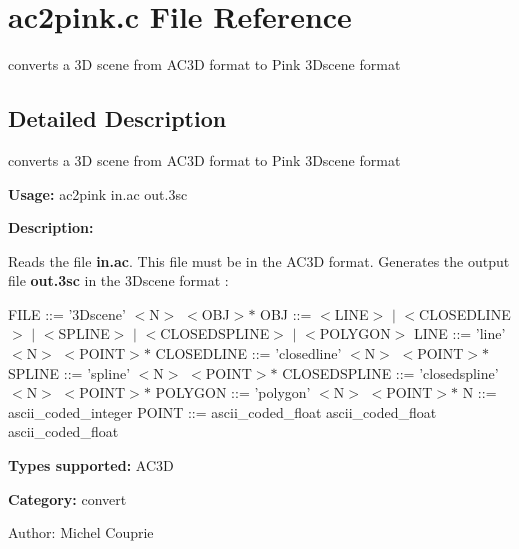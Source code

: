 \section{ac2pink.c File Reference}
\label{ac2pink_8c}
converts a 3D scene from AC3D format to Pink 3Dscene format  




\label{_details}
\subsection{Detailed Description}
converts a 3D scene from AC3D format to Pink 3Dscene format 

{\bf Usage:} ac2pink in.ac out.3sc

{\bf Description:}

Reads the file {\bf in.ac}. This file must be in the AC3D format. Generates the output file {\bf out.3sc} in the 3Dscene format :

FILE ::= '3Dscene' $<$N$>$ $<$OBJ$>$$\ast$ OBJ ::= $<$LINE$>$ $|$ $<$CLOSEDLINE$>$ $|$ $<$SPLINE$>$ $|$ $<$CLOSEDSPLINE$>$ $|$ $<$POLYGON$>$ LINE ::= 'line' $<$N$>$ $<$POINT$>$$\ast$ CLOSEDLINE ::= 'closedline' $<$N$>$ $<$POINT$>$$\ast$ SPLINE ::= 'spline' $<$N$>$ $<$POINT$>$$\ast$ CLOSEDSPLINE ::= 'closedspline' $<$N$>$ $<$POINT$>$$\ast$ POLYGON ::= 'polygon' $<$N$>$ $<$POINT$>$$\ast$ N ::= ascii\_\-coded\_\-integer POINT ::= ascii\_\-coded\_\-float ascii\_\-coded\_\-float ascii\_\-coded\_\-float

{\bf Types supported:} AC3D

{\bf Category:} convert

\begin{Desc}
\item[Author:]Michel Couprie \end{Desc}
